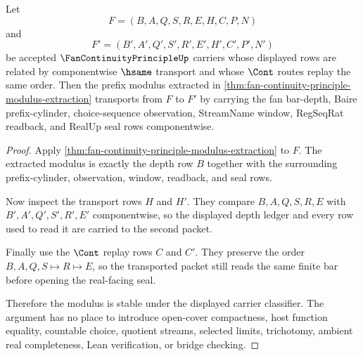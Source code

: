 \begin{theorem}
\label{thm:fan-continuity-principle-bar-stability}
Let
$$
F=(B,A,Q,S,R,E,H,C,P,N)
$$
and
$$
F'=(B',A',Q',S',R',E',H',C',P',N')
$$
be accepted $\FanContinuityPrincipleUp$ carriers whose displayed rows are related by componentwise $\hsame$ transport and whose $\Cont$ routes replay the same order. Then the prefix modulus extracted in \autoref{thm:fan-continuity-principle-modulus-extraction} transports from $F$ to $F'$ by carrying the fan bar-depth, Baire prefix-cylinder, choice-sequence observation, StreamName window, RegSeqRat readback, and RealUp seal rows componentwise.
\end{theorem}
\begin{proof}
Apply \autoref{thm:fan-continuity-principle-modulus-extraction} to $F$. The extracted modulus is exactly the depth row $B$ together with the surrounding prefix-cylinder, observation, window, readback, and seal rows.

Now inspect the transport rows $H$ and $H'$. They compare $B,A,Q,S,R,E$ with $B',A',Q',S',R',E'$ componentwise, so the displayed depth ledger and every row used to read it are carried to the second packet.

Finally use the $\Cont$ replay rows $C$ and $C'$. They preserve the order $B,A,Q,S \longmapsto R \longmapsto E$, so the transported packet still reads the same finite bar before opening the real-facing seal.

Therefore the modulus is stable under the displayed carrier classifier. The argument has no place to introduce open-cover compactness, host function equality, countable choice, quotient streams, selected limits, trichotomy, ambient real completeness, Lean verification, or bridge checking.
\end{proof}

